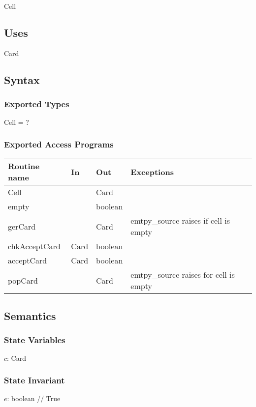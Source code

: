 \documentclass[12pt,fleqn]{article}
\begin{document}
Cell

\subsection* {Uses}

Card

\subsection* {Syntax}


\subsubsection* {Exported Types}

Cell = ?

\subsubsection* {Exported Access Programs}

\begin{tabular}{| l | l | l | l |}
\hline
\textbf{Routine name} & \textbf{In} & \textbf{Out} & \textbf{Exceptions}\\
\hline
 Cell & ~ & Card & ~\\
\hline
empty & ~ & boolean &  \\
\hline
gerCard &  & Card & emtpy\_source raises if cell is empty\\
\hline
chkAcceptCard & Card & boolean & \\
\hline 
acceptCard & Card & boolean & \\
\hline 
popCard &  & Card & emtpy\_source raises for cell is empty\\
\hline 

\end{tabular}

\subsection* {Semantics}

\subsubsection* {State Variables}


$c$: Card \\

\subsubsection* {State Invariant}
$e$: boolean // True\\ 
\end{document}
